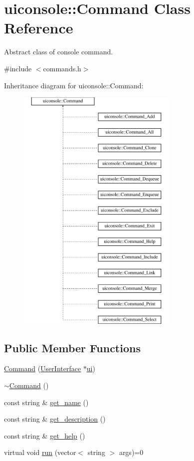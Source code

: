\hypertarget{classuiconsole_1_1Command}{
\section{uiconsole::Command Class Reference}
\label{dc/df0/classuiconsole_1_1Command}
}


Abstract class of console command.  




{\ttfamily \#include $<$commands.h$>$}

Inheritance diagram for uiconsole::Command:\begin{figure}[H]
\begin{center}
\leavevmode
\includegraphics[height=12.000000cm]{dc/df0/classuiconsole_1_1Command}
\end{center}
\end{figure}
\subsection*{Public Member Functions}
\begin{DoxyCompactItemize}
\item 
\hyperlink{classuiconsole_1_1Command_a4f28955b8a36ef1d3b4402b081346060}{Command} (\hyperlink{classUserInterface}{UserInterface} $\ast$\hyperlink{classuiconsole_1_1Command_ab43ed5152860c099f858d62f9f556699}{ui})
\item 
\hyperlink{classuiconsole_1_1Command_a11421d325715cfc8f1e779ef823b3445}{$\sim$Command} ()
\item 
const string \& \hyperlink{classuiconsole_1_1Command_ac7dbbea517086411a60d48faa2f15ae8}{get\_\-name} ()
\item 
const string \& \hyperlink{classuiconsole_1_1Command_a6f548d67af5035358bbf0bcaf129619b}{get\_\-description} ()
\item 
const string \& \hyperlink{classuiconsole_1_1Command_a50ea5c140158782f5c87b51399ba461a}{get\_\-help} ()
\item 
virtual void \hyperlink{classuiconsole_1_1Command_a5c4d205b1de13a6b3d0db73ddc7ebefa}{run} (vector$<$ string $>$ args)=0
\end{DoxyCompactItemize}
